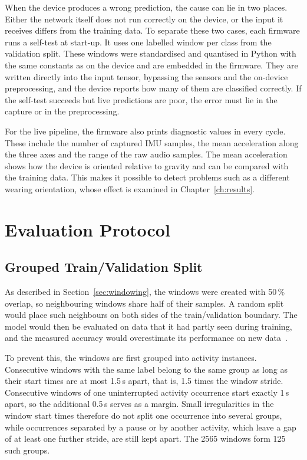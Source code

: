 When the device produces a wrong prediction, the cause can lie in two places.
Either the network itself does not run correctly on the device, or the input it
receives differs from the training data. To separate these two cases, each
firmware runs a self-test at start-up. It uses one labelled window per class from
the validation split. These windows were standardised and quantised in Python
with the same constants as on the device and are embedded in the firmware. They
are written directly into the input tensor, bypassing the sensors and the
on-device preprocessing, and the device reports how many of them are classified
correctly. If the self-test succeeds but live predictions are poor, the error must
lie in the capture or in the preprocessing.

For the live pipeline, the firmware also prints diagnostic values in every cycle.
These include the number of captured IMU samples, the mean acceleration along the
three axes and the range of the raw audio samples. The mean acceleration shows how
the device is oriented relative to gravity and can be compared with the training
data. This makes it possible to detect problems such as a different wearing
orientation, whose effect is examined in Chapter~\ref{ch:results}.

\section{Evaluation Protocol}
\label{sec:evaluation}

\subsection{Grouped Train/Validation Split}
\label{sec:split}

As described in Section~\ref{sec:windowing}, the windows were created with
50\,\% overlap, so neighbouring windows share half of their samples. A random split would place such
neighbours on both sides of the train/validation boundary. The model would then
be evaluated on data that it had partly seen during training, and the measured
accuracy would overestimate its performance on new
data~\cite{hammerla2015lets}.

To prevent this, the windows are first grouped into activity instances.
Consecutive windows with the same label belong to the same group as long as their
start times are at most 1.5\,s apart, that is, 1.5 times the window stride.
Consecutive windows of one uninterrupted activity occurrence start exactly 1\,s
apart, so the additional 0.5\,s serves as a margin. Small irregularities in the
window start times therefore do not split one occurrence into several groups,
while occurrences separated by a pause or by another activity, which leave a gap
of at least one further stride, are still kept apart. The 2565 windows form 125 such groups.

